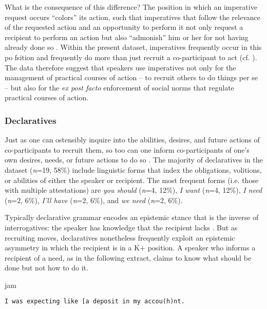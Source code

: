 \documentclass[output=paper,nonflat,modfont,draft]{langsci/langscibook}
\begin{document}
What is the consequence of this difference? The position in which an imperative request occurs “colors” its action, such that imperatives that follow the relevance of the requested action and an opportunity to perform it not only request a recipient to perform an action but also “admonish” him or her for not having already done so \citep{KentKendrick2016}. Within the present dataset, imperatives frequently occur in this po fsition and frequently do more than just recruit a co-participant to act (cf. \citealt{Mandelbaum2014}). The data therefore suggest that speakers use imperatives not only for the management of practical courses of action -- to recruit others to do things per se -- but also for the \textit{ex post facto} enforcement of social norms that regulate practical courses of action.

\subsubsection{Declaratives}\label{sec:kendrick:4.2.3}
Just as one can ostensibly inquire into the abilities, desires, and future actions of co-participants to recruit them, so too can one inform co-participants of one’s own desires, needs, or future actions to do so \citep[see][]{Stevanovic2011, Childs2012}. The majority of declaratives in the dataset (\textit{n}=19, 58\%) include linguistic forms that index the obligations, volitions, or abilities of either the speaker or recipient. The most frequent forms (i.e. those with multiple attestations) are \textit{you should} (\textit{n}=4, 12\%), \textit{I want} (\textit{n}=4, 12\%), \textit{I need} (\textit{n}=2, 6\%), \textit{I’ll have} (\textit{n}=2, 6\%), and \textit{we need} (\textit{n}=2, 6\%).

Typically declarative grammar encodes an epistemic stance that is the inverse of interrogatives: the speaker has knowledge that the recipient lacks \citep{heritage_terms_2005, Raymond2010, heritage2012}. But as recruiting moves, declaratives nonetheless frequently exploit an epistemic asymmetry in which the recipient is in a K+ position. A speaker who informs a recipient of a need, as in the following extract, claims to know what should be done but not how to do it.


\begin{transbox}{1}{jam}
\begin{verbatim}
I was expecting like [a deposit in my accou(h)nt.
\end{verbatim}
\end{transbox}
\end{document}
